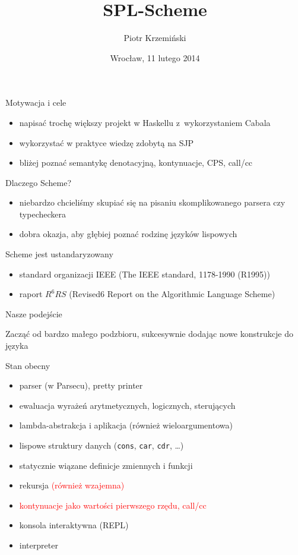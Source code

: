 \documentclass[12pt,serif]{beamer}
\title{SPL-Scheme}
\author{Piotr Krzemiński}
\date{Wrocław, 11 lutego 2014}
\begin{document}
\begin{frame}
\titlepage
\end{frame}


\begin{frame}{Motywacja i cele}
\begin{itemize}
  \item napisać trochę większy projekt w Haskellu z~wykorzystaniem Cabala
  \item wykorzystać w praktyce wiedzę zdobytą na SJP
  \item bliżej poznać semantykę denotacyjną, kontynuacje, CPS, call/cc
\end{itemize}
\end{frame}

\begin{frame}{Dlaczego Scheme?}
\begin{itemize}
  \item niebardzo chcieliśmy skupiać się na pisaniu skomplikowanego
        parsera czy typecheckera
  \item dobra okazja, aby głębiej poznać rodzinę języków lispowych
\end{itemize}
\end{frame}

\begin{frame}{Scheme jest ustandaryzowany}
\begin{itemize}
  \item standard organizacji IEEE (The IEEE standard, 1178-1990 (R1995))
  \item raport $R^6RS$ (Revised6 Report on the Algorithmic Language Scheme)
\end{itemize}
\end{frame}

\begin{frame}{Nasze podejście}
\begin{center}
Zacząć od bardzo małego podzbioru, sukcesywnie dodając
nowe konstrukcje do języka
\end{center}
\end{frame}

\begin{frame}{Stan obecny}
\begin{itemize}
  \item parser (w Parsecu), pretty printer
  \item ewaluacja wyrażeń arytmetycznych, logicznych, sterujących
  \item lambda-abstrakcja i aplikacja (również wieloargumentowa)
  \item lispowe struktury danych (\texttt{cons}, \texttt{car}, \texttt{cdr}, \ldots)
  \item statycznie wiązane definicje zmiennych i funkcji
  \item rekursja \textcolor{red}{(również wzajemna)}
  \item \textcolor{red}{kontynuacje jako wartości pierwszego rzędu, call/cc}
  \item konsola interaktywna (REPL)
  \item interpreter
\end{itemize}
\end{frame}
\end{document}
